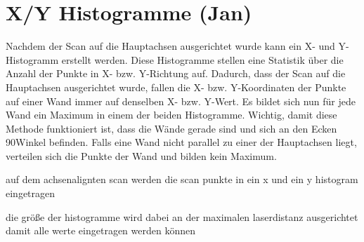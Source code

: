 \section{X/Y Histogramme (Jan)}

Nachdem der Scan auf die Hauptachsen ausgerichtet wurde kann ein X- und Y-Histogramm erstellt werden. Diese Histogramme stellen eine Statistik über die Anzahl der Punkte in X- bzw. Y-Richtung auf.
Dadurch, dass der Scan auf die Hauptachsen ausgerichtet wurde, fallen die X- bzw. Y-Koordinaten der Punkte auf einer Wand immer auf denselben X- bzw. Y-Wert. Es bildet sich nun für jede Wand ein Maximum in einem der beiden Histogramme. Wichtig, damit diese Methode funktioniert ist, dass die Wände gerade sind und sich an den Ecken 90\degree Winkel befinden. Falls eine Wand nicht parallel zu einer der Hauptachsen liegt, verteilen sich die Punkte der Wand und bilden kein Maximum.


auf dem achsenalignten scan werden die scan punkte in ein x und ein y histogram eingetragen

die größe der histogramme wird dabei an der maximalen laserdistanz ausgerichtet damit alle werte eingetragen werden können